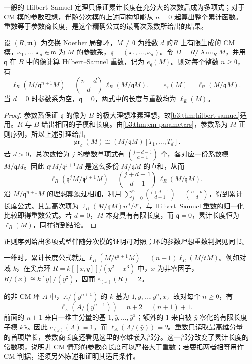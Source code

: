 一般的 Hilbert–Samuel 定理只保证累计长度在充分大的次数后成为多项式；对于 CM 模的参数理想，伴随分次模的上述同构却能从 \(n=0\) 起算出整个累计函数。重数等于参数商长度，是这个精确公式的最高次系数所给出的结果。

\begin{theorem}[CM 模的参数理想重数]\label{b3:thm:cm-parameter-multiplicity}
	设 \((R,\mathfrak m)\) 为交换 Noether 局部环，\(M\ne0\) 为维数 \(d\) 的\(R\) 上有限生成的 CM 模，\(x_1,\ldots,x_d\in\mathfrak m\) 为 \(M\) 的参数系，\(\mathfrak q=(x_1,\ldots,x_d)\)。令 \(B=R/\operatorname{Ann}_RM\)，并用 \(\mathfrak q\) 在 \(B\) 中的像计算 Hilbert–Samuel 重数，记为 \(e_{\mathfrak q}(M)\)。则对每个整数 \(n\ge0\)，有
	\[
		\ell_R(M/\mathfrak q^{n+1}M) =\binom{n+d}{d}\,\ell_R(M/\mathfrak qM), \qquad e_{\mathfrak q}(M)=\ell_R(M/\mathfrak qM).
	\]
	当 \(d=0\) 时参数系为空，\(\mathfrak q=0\)，两式中的长度与重数均为 \(\ell_R(M)\)。
\end{theorem}
\begin{proof}
	参数系保证 \(\mathfrak q\) 的像为 \(B\) 的极大理想准素理想，故\cref{b3:thm:hilbert-samuel}适用。\(R\) 与 \(B\) 给出相同的子模和长度。由\cref{b3:thm:cm-parameters}，参数系为 \(M\) 正则序列，所以上述引理给出
	\[
		\operatorname{gr}_{\mathfrak q}(M) \cong(M/\mathfrak qM)[T_1,\ldots,T_d].
	\]
	若 \(d>0\)，总次数恰为 \(j\) 的参数单项式有 \(\binom{j+d-1}{d-1}\) 个，各对应一份系数模 \(M/\mathfrak qM\)。因此 \(\mathfrak q^jM/\mathfrak q^{j+1}M\) 是这么多份 \(M/\mathfrak qM\) 的直和，从而
	\[
		\ell_R(\mathfrak q^jM/\mathfrak q^{j+1}M) =\binom{j+d-1}{d-1}\,\ell_R(M/\mathfrak qM).
	\]
	沿 \(M/\mathfrak q^{n+1}M\) 的理想幂滤过相加，利用 \(\sum_{j=0}^n\binom{j+d-1}{d-1}=\binom{n+d}{d}\)，得到累计长度公式。其最高次项为 \(\ell_R(M/\mathfrak qM)n^d/d!\)，与 Hilbert–Samuel 重数的归一化比较即得重数公式。若 \(d=0\)，\(M\) 本身具有有限长度，而 \(\mathfrak q=0\)，累计长度恒为 \(\ell_R(M)\)，同样得到结论。
\end{proof}

正则序列给出多项式型伴随分次模的证明可对照\cite[Theorem 16.2, pp. 125--126]{Matsumura1989CommutativeRingTheory}；环的参数理想重数判据见同书\cite[Theorem 17.11, p. 138]{Matsumura1989CommutativeRingTheory}。

一维时，累计长度公式就是 \(\ell_R(M/t^{n+1}M)=(n+1)\ell_R(M/tM)\)。例如对域 \(k\)，在尖点环 \(R=k[\![x,y]\!]/(y^2-x^3)\) 中，\(x\) 为非零因子，\(R/(x)\cong k[y]/(y^2)\)，因而 \(e_{(x)}(R)=2\)。

\ProseParagraphBreak
{}的非 CM 环 \(A\) 中，\(A/(\bar y^{n+1})\) 的 \(k\) 基为 \(1,\bar y,\ldots,\bar y^n,\bar x\)，故对每个 \(n\ge0\)，有
\[
	\ell_A(A/(\bar y^{n+1}))=n+2=(n+1)+1.
\]
前面的 \(n+1\) 来自一维主分量的基 \(1,\bar y,\ldots,\bar y^n\)；额外的 \(1\) 来自被 \(\bar y\) 零化的有限长度子模 \(k\bar x\)。因此 \(e_{(\bar y)}(A)=1\)，而 \(\ell_A(A/(\bar y))=2\)。重数只读取最高维分量的首项增长，参数商长度还看见这里的零维嵌入部分。这一部分改变了累计长度的常数项，说明非 CM 情形的参数商长度可以严格大于重数；若要把两者相等用作 CM 判据，还须另外陈述和证明其适用条件。
